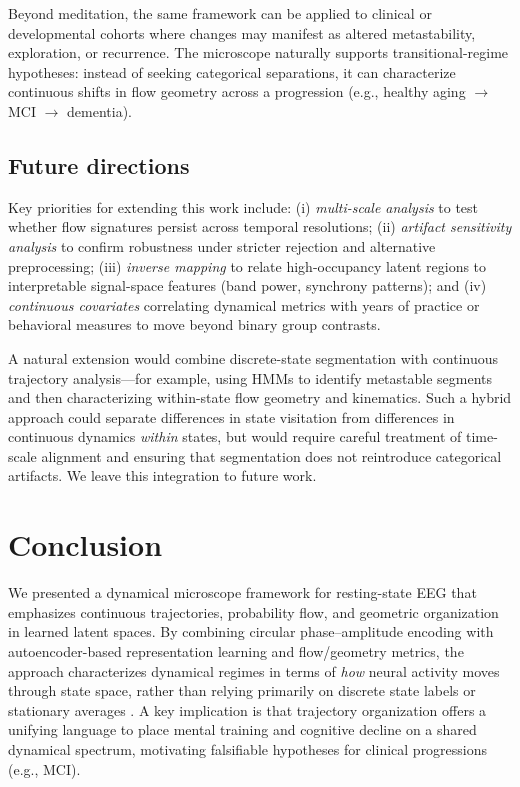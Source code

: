\documentclass[5p,twocolumn,authoryear]{elsarticle}
\begin{document}
Beyond meditation, the same framework can be applied to clinical or developmental cohorts where changes may manifest as altered metastability, exploration, or recurrence. The microscope naturally supports transitional-regime hypotheses: instead of seeking categorical separations, it can characterize continuous shifts in flow geometry across a progression (e.g., healthy aging $\rightarrow$ MCI $\rightarrow$ dementia).

\subsection{Future directions}
Key priorities for extending this work include: (i) \emph{multi-scale analysis} to test whether flow signatures persist across temporal resolutions; (ii) \emph{artifact sensitivity analysis} to confirm robustness under stricter rejection and alternative preprocessing; (iii) \emph{inverse mapping} to relate high-occupancy latent regions to interpretable signal-space features (band power, synchrony patterns); and (iv) \emph{continuous covariates} correlating dynamical metrics with years of practice or behavioral measures to move beyond binary group contrasts.

A natural extension would combine discrete-state segmentation with continuous trajectory analysis---for example, using HMMs to identify metastable segments and then characterizing within-state flow geometry and kinematics. Such a hybrid approach could separate differences in state visitation from differences in continuous dynamics \emph{within} states, but would require careful treatment of time-scale alignment and ensuring that segmentation does not reintroduce categorical artifacts. We leave this integration to future work.

\section{Conclusion}
\label{sec:conclusion}
We presented a dynamical microscope framework for resting-state EEG that emphasizes continuous trajectories, probability flow, and geometric organization in learned latent spaces. By combining circular phase--amplitude encoding with autoencoder-based representation learning and flow/geometry metrics, the approach characterizes dynamical regimes in terms of \emph{how} neural activity moves through state space, rather than relying primarily on discrete state labels or stationary averages \citep{CahnPolich2006}. A key implication is that trajectory organization offers a unifying language to place mental training and cognitive decline on a shared dynamical spectrum, motivating falsifiable hypotheses for clinical progressions (e.g., MCI). 
\end{document}

